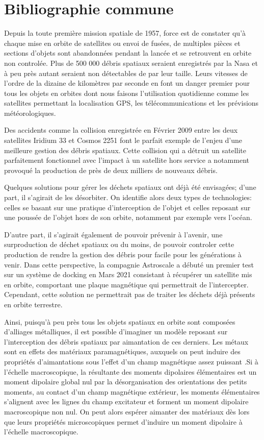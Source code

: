 \documentclass[a4paper,1pt]{article}
\begin{document}
\section{Bibliographie commune}
Depuis la toute première mission spatiale de 1957, force est de constater qu'à chaque mise en orbite de satellites ou envoi de fusées, de multiples pièces et sections d'objets sont abandonnées pendant la lancée et se retrouvent en orbite non controlée. Plus de 500 000 débris spatiaux seraient enregistrés par la Nasa et à peu près autant seraient non détectables de par leur taille. Leurs vitesses de l'ordre de la dizaine de kilomètres par seconde en font un danger premier pour tous les objets en orbites dont nous faisons l'utilisation quotidienne comme les satellites permettant la localisation GPS, les télécommunications et les prévisions météorologiques. \cite{Kurz1}

Des accidents comme la collision enregistrée en Février 2009 entre les deux satellites Iridium 33 et Cosmos 2251 \cite{CollExemple} font le parfait exemple de l'enjeu d'une meilleure gestion des débris spatiaux. Cette collision qui a détruit un satellite parfaitement fonctionnel avec l'impact à un satellite hors service a notamment provoqué la production de près de deux milliers de nouveaux débris. 

Quelques solutions \cite{SolExemples} pour gérer les déchets spatiaux ont déjà été envisagées; d'une part, il s'agirait de les désorbiter. On identifie alors deux types de technologies: celles se basant sur une pratique d'interception de l'objet et celles reposant sur une poussée de l'objet hors de son orbite, notamment par exemple vers l'océan. 

D'autre part, il s'agirait également de pouvoir prévenir à l'avenir, une surproduction de déchet spatiaux ou du moins, de pouvoir controler cette production de rendre la gestion des débris pour facile pour les générations à venir. Dans cette perspective, la compagnie Astroscale a débuté un premier test sur un système de docking en Mars 2021 \cite{Astroscale} consistant à récupérer un satellite mis en orbite, comportant une plaque magnétique qui permettrait de l'intercepter. Cependant, cette solution ne permettrait pas de traiter les déchets déjà présents en orbite terrestre.

Ainsi, puisqu'à peu près tous les objets spatiaux en orbite sont composées d'alliages métalliques, il est possible d'imaginer un modèle reposant sur l'interception des débris spatiaux par aimantation de ces derniers. Les métaux sont en effets des matériaux paramagnétiques, auxquels on peut induire des propriétés d'aimantations sous l'effet d'un champ magnétique assez puissant \cite{MatMagnetiques}.Si à l'échelle macroscopique, la résultante des moments dipolaires élémentaires est un moment dipolaire global nul par la désorganisation des orientations des petits moments, au contact d'un champ magnétique extérieur, les moments élémentaires s'alignent avec les lignes du champ excitateur et forment un moment dipolaire macroscopique non nul. On peut alors espérer aimanter des matériaux dès lors que leurs propriétés microscopiques permet d'induire un moment dipolaire à l'échelle macroscopique.
\end{document}
